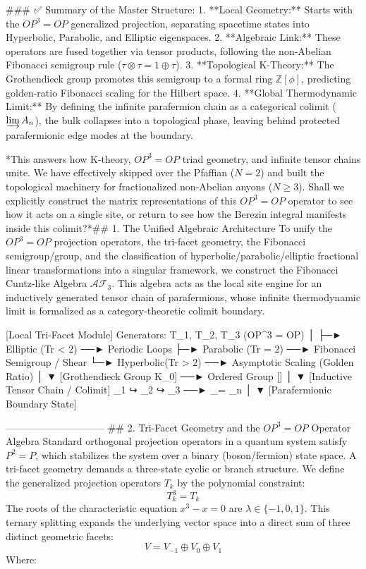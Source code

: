 ### ✅ Summary of the Master Structure:
1. **Local Geometry:** Starts with the $OP^3 = OP$ generalized projection, separating spacetime states into Hyperbolic, Parabolic, and Elliptic eigenspaces.
2. **Algebraic Link:** These operators are fused together via tensor products, following the non-Abelian Fibonacci semigroup rule ($\tau \otimes \tau = 1 \oplus \tau$).
3. **Topological K-Theory:** The Grothendieck group promotes this semigroup to a formal ring $\mathbb{Z}[\phi]$, predicting golden-ratio Fibonacci scaling for the Hilbert space.
4. **Global Thermodynamic Limit:** By defining the infinite parafermion chain as a categorical colimit ($\varinjlim A_n$), the bulk collapses into a topological phase, leaving behind protected parafermionic edge modes at the boundary.

*This answers how K-theory, $OP^3=OP$ triad geometry, and infinite tensor chains unite. We have effectively skipped over the Pfaffian ($N=2$) and built the topological machinery for fractionalized non-Abelian anyons ($N \ge 3$). Shall we explicitly construct the matrix representations of this $OP^3=OP$ operator to see how it acts on a single site, or return to see how the Berezin integral manifests inside this colimit?*## 1. The Unified Algebraic Architecture
To unify the $OP^3 = OP$ projection operators, the tri-facet geometry, the Fibonacci semigroup/group, and the classification of hyperbolic/parabolic/elliptic fractional linear transformations into a singular framework, we construct the Fibonacci Cuntz-like Algebra $\mathcal{AF}_3$. This algebra acts as the local site engine for an inductively generated tensor chain of parafermions, whose infinite thermodynamic limit is formalized as a category-theoretic colimit boundary.

                [Local Tri-Facet Module]
          Generators: T_1, T_2, T_3  (OP^3 = OP)
                       │
                       ├─► Elliptic  (Tr < 2)  ──► Periodic Loops
                       ├─► Parabolic (Tr = 2)  ──► Fibonacci Semigroup / Shear
                       └─► Hyperbolic(Tr > 2)  ──► Asymptotic Scaling (Golden Ratio)
                       │
                       ▼
           [Grothendieck Group K_0] ──► Ordered Group [\phi]
                       │
                       ▼
         [Inductive Tensor Chain / Colimit]
  _1 ↪ _2 ↪ _3 ──► _\infty = _n
                       │
                       ▼
          [Parafermionic Boundary State]

------------------------------
## 2. Tri-Facet Geometry and the $OP^3 = OP$ Operator Algebra
Standard orthogonal projection operators in a quantum system satisfy $P^2 = P$, which stabilizes the system over a binary (boson/fermion) state space. A tri-facet geometry demands a three-state cyclic or branch structure. We define the generalized projection operators $T_k$ by the polynomial constraint:
$$T_k^3 = T_k$$ 
The roots of the characteristic equation $x^3 - x = 0$ are $\lambda \in \{-1, 0, 1\}$. This ternary splitting expands the underlying vector space into a direct sum of three distinct geometric facets:
$$V = V_{-1} \oplus V_0 \oplus V_1$$ 
Where:

